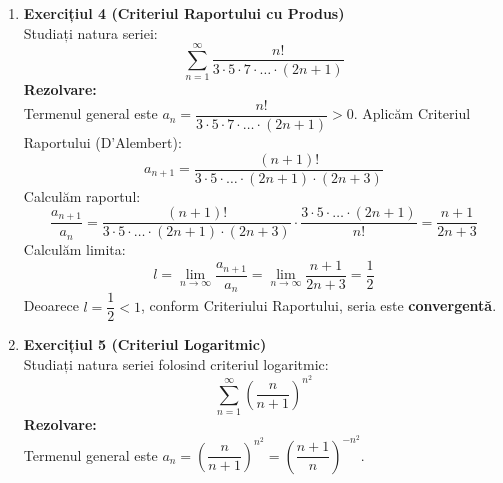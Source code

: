 \documentclass[12pt, a4paper]{report}
\begin{document}
\begin{enumerate}[label=\textbf{\roman*)}]
		Încercăm mai întâi Criteriul Raportului:
		\[
		\frac{a_{n+1}}{a_n} = \frac{1 \cdot 3 \cdot \ldots \cdot (2n-1) \cdot (2n+1)}{2 \cdot 4 \cdot \ldots \cdot (2n) \cdot (2n+2)} \cdot \frac{2 \cdot 4 \cdot \ldots \cdot (2n)}{1 \cdot 3 \cdot \ldots \cdot (2n-1)} = \frac{2n+1}{2n+2}
		\]
		\[
		l = \lim_{n \to \infty} \frac{a_{n+1}}{a_n} = \lim_{n \to \infty} \frac{2n+1}{2n+2} = 1 \quad \text{(?)}
		\]
		Deoarece Criteriul Raportului furnizează $l = 1$, aplicăm Criteriul Raabe-Duhamel:
		\[
		l_{Raabe} = \lim_{n \to \infty} n \left( \frac{a_n}{a_{n+1}} - 1 \right) = \lim_{n \to \infty} n \left( \frac{2n+2}{2n+1} - 1 \right) = \lim_{n \to \infty} n \cdot \frac{1}{2n+1} = \lim_{n \to \infty} \frac{n}{2n+1} = \frac{1}{2}
		\]
		Deoarece $l_{Raabe} = \dfrac{1}{2} < 1$, conform Criteriului Raabe-Duhamel, seria este \textbf{divergentă}.
		
		\vspace{0.5cm}
		
		\item \textbf{Exercițiul 4 (Criteriul Raportului cu Produs)} \\
		Studiați natura seriei:
		\[
		\sum_{n=1}^{\infty} \frac{n!}{3 \cdot 5 \cdot 7 \cdot \ldots \cdot (2n+1)}
		\]
		\textbf{Rezolvare:} \\
		Termenul general este $a_n = \dfrac{n!}{3 \cdot 5 \cdot 7 \cdot \ldots \cdot (2n+1)} > 0$. Aplicăm Criteriul Raportului (D'Alembert):
		\[
		a_{n+1} = \frac{(n+1)!}{3 \cdot 5 \cdot \ldots \cdot (2n+1) \cdot (2n+3)}
		\]
		Calculăm raportul:
		\[
		\frac{a_{n+1}}{a_n} = \frac{(n+1)!}{3 \cdot 5 \cdot \ldots \cdot (2n+1) \cdot (2n+3)} \cdot \frac{3 \cdot 5 \cdot \ldots \cdot (2n+1)}{n!} = \frac{n+1}{2n+3}
		\]
		Calculăm limita:
		\[
		l = \lim_{n \to \infty} \frac{a_{n+1}}{a_n} = \lim_{n \to \infty} \frac{n+1}{2n+3} = \frac{1}{2}
		\]
		Deoarece $l = \dfrac{1}{2} < 1$, conform Criteriului Raportului, seria este \textbf{convergentă}.
		
		\vspace{0.5cm}
		
		\item \textbf{Exercițiul 5 (Criteriul Logaritmic)} \\
		Studiați natura seriei folosind criteriul logaritmic:
		\[
		\sum_{n=1}^{\infty} \left(\frac{n}{n+1}\right)^{n^2}
		\]
		\textbf{Rezolvare:} \\
		Termenul general este $a_n = \left(\dfrac{n}{n+1}\right)^{n^2} = \left(\dfrac{n+1}{n}\right)^{-n^2}$.
		

\end{enumerate}
\end{document}
